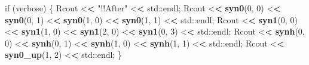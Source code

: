 \documentclass[]{article}
\newenvironment{Shaded}{\begin{snugshade}}{\end{snugshade}}
\newcommand{\KeywordTok}[1]{\textcolor[rgb]{0.13,0.29,0.53}{\textbf{{#1}}}}
\newcommand{\DecValTok}[1]{\textcolor[rgb]{0.00,0.00,0.81}{{#1}}}
\newcommand{\StringTok}[1]{\textcolor[rgb]{0.31,0.60,0.02}{{#1}}}
\newcommand{\ErrorTok}[1]{\textcolor[rgb]{0.64,0.00,0.00}{\textbf{{#1}}}}
\newcommand{\NormalTok}[1]{{#1}}
\begin{document}
\begin{Shaded}
\begin{Highlighting}[]
{{    \NormalTok{if (verbose) \{}
      \NormalTok{Rcout <}\ErrorTok{<}\StringTok{ "!!After"} \NormalTok{<}\ErrorTok{<}\StringTok{ }\NormalTok{std::endl;}
      \NormalTok{Rcout <}\ErrorTok{<}\StringTok{ }\KeywordTok{syn0}\NormalTok{(}\DecValTok{0}\NormalTok{, }\DecValTok{0}\NormalTok{) <}\ErrorTok{<}\StringTok{ }\KeywordTok{syn0}\NormalTok{(}\DecValTok{0}\NormalTok{, }\DecValTok{1}\NormalTok{) <}\ErrorTok{<}\StringTok{ }\KeywordTok{syn0}\NormalTok{(}\DecValTok{1}\NormalTok{, }\DecValTok{0}\NormalTok{) <}\ErrorTok{<}\StringTok{ }\KeywordTok{syn0}\NormalTok{(}\DecValTok{1}\NormalTok{, }\DecValTok{1}\NormalTok{) <}\ErrorTok{<}\StringTok{ }\NormalTok{std::endl;}
      \NormalTok{Rcout <}\ErrorTok{<}\StringTok{ }\KeywordTok{syn1}\NormalTok{(}\DecValTok{0}\NormalTok{, }\DecValTok{0}\NormalTok{) <}\ErrorTok{<}\StringTok{ }\KeywordTok{syn1}\NormalTok{(}\DecValTok{1}\NormalTok{, }\DecValTok{0}\NormalTok{) <}\ErrorTok{<}\StringTok{ }\KeywordTok{syn1}\NormalTok{(}\DecValTok{2}\NormalTok{, }\DecValTok{0}\NormalTok{) <}\ErrorTok{<}\StringTok{ }\KeywordTok{syn1}\NormalTok{(}\DecValTok{0}\NormalTok{, }\DecValTok{3}\NormalTok{) <}\ErrorTok{<}\StringTok{ }\NormalTok{std::endl;}
      \NormalTok{Rcout <}\ErrorTok{<}\StringTok{ }\KeywordTok{synh}\NormalTok{(}\DecValTok{0}\NormalTok{, }\DecValTok{0}\NormalTok{) <}\ErrorTok{<}\StringTok{ }\KeywordTok{synh}\NormalTok{(}\DecValTok{0}\NormalTok{, }\DecValTok{1}\NormalTok{) <}\ErrorTok{<}\StringTok{ }\KeywordTok{synh}\NormalTok{(}\DecValTok{1}\NormalTok{, }\DecValTok{0}\NormalTok{) <}\ErrorTok{<}\StringTok{ }\KeywordTok{synh}\NormalTok{(}\DecValTok{1}\NormalTok{, }\DecValTok{1}\NormalTok{) <}\ErrorTok{<}\StringTok{ }\NormalTok{std::endl;}
      \NormalTok{Rcout <}\ErrorTok{<}\StringTok{ }\KeywordTok{syn0_up}\NormalTok{(}\DecValTok{1}\NormalTok{, }\DecValTok{2}\NormalTok{) <}\ErrorTok{<}\StringTok{ }\NormalTok{std::endl;}
    \NormalTok{\}}

}}
\end{Highlighting}
\end{Shaded}
\end{document}
